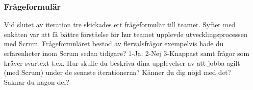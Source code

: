 \subsubsection {Frågeformulär}
Vid slutet av iteration tre skickades ett frågeformulär till teamet. Syftet med enkäten var att få bättre förståelse för hur teamet upplevde utvecklingsprocessen med Scrum. Frågeformuläret bestod av flervalsfrågor exempelvis hade du erfarenheter inom Scrum sedan tidigare? 1-Ja. 2-Nej 3-Knappast samt frågor som kräver svartext t.ex. Hur skulle du beskriva dina upplevelser av att jobba agilt (med Scrum) under de senaste iterationerna? Känner du dig nöjd med det? Saknar du någon del?
\newpage